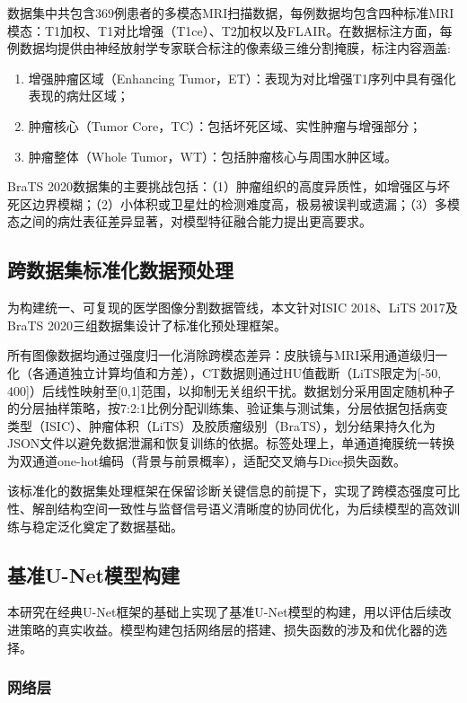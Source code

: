 数据集中共包含369例患者的多模态MRI扫描数据，每例数据均包含四种标准MRI模态：T1加权、T1对比增强（T1ce）、T2加权以及FLAIR。在数据标注方面，每例数据均提供由神经放射学专家联合标注的像素级三维分割掩膜，标注内容涵盖:

\begin{enumerate}
    \item 增强肿瘤区域（Enhancing Tumor，ET）：表现为对比增强T1序列中具有强化表现的病灶区域；
    \item 肿瘤核心（Tumor Core，TC）：包括坏死区域、实性肿瘤与增强部分；
    \item 肿瘤整体（Whole Tumor，WT）：包括肿瘤核心与周围水肿区域。
\end{enumerate}

BraTS 2020数据集的主要挑战包括：（1）肿瘤组织的高度异质性，如增强区与坏死区边界模糊；（2）小体积或卫星灶的检测难度高，极易被误判或遗漏；（3）多模态之间的病灶表征差异显著，对模型特征融合能力提出更高要求。


\subsection{跨数据集标准化数据预处理}

为构建统一、可复现的医学图像分割数据管线，本文针对ISIC 2018、LiTS 2017及BraTS 2020三组数据集设计了标准化预处理框架。

所有图像数据均通过强度归一化消除跨模态差异：皮肤镜与MRI采用通道级归一化（各通道独立计算均值和方差），CT数据则通过HU值截断（LiTS限定为[-50, 400]）后线性映射至[0,1]范围，以抑制无关组织干扰。数据划分采用固定随机种子的分层抽样策略，按7:2:1比例分配训练集、验证集与测试集，分层依据包括病变类型（ISIC）、肿瘤体积（LiTS）及胶质瘤级别（BraTS），划分结果持久化为JSON文件以避免数据泄漏和恢复训练的依据。标签处理上，单通道掩膜统一转换为双通道one-hot编码（背景与前景概率），适配交叉熵与Dice损失函数。  

该标准化的数据集处理框架在保留诊断关键信息的前提下，实现了跨模态强度可比性、解剖结构空间一致性与监督信号语义清晰度的协同优化，为后续模型的高效训练与稳定泛化奠定了数据基础。

\subsection{基准U-Net模型构建}

本研究在经典U-Net框架的基础上实现了基准U-Net模型的构建，用以评估后续改进策略的真实收益。模型构建包括网络层的搭建、损失函数的涉及和优化器的选择。

\subsubsection{网络层}


